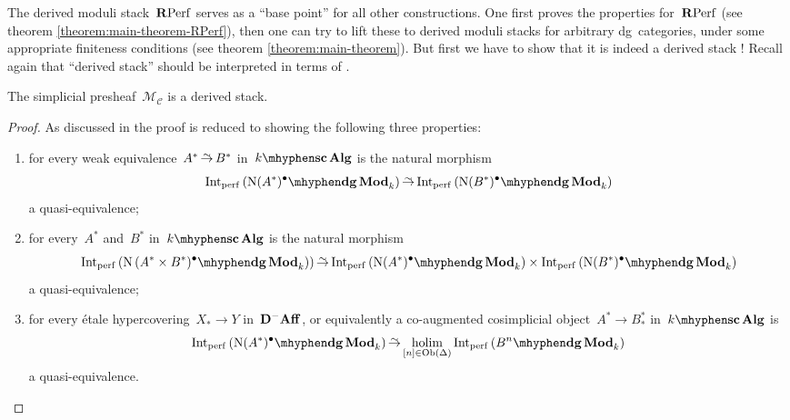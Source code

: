 \begin{refsection}
The derived moduli stack~$\mathbf{R}\mathrm{Perf}$ serves as a ``base point'' for all other constructions. One first proves the properties for~$\mathbf{R}\mathrm{Perf}$ (see theorem \ref{theorem:main-theorem-RPerf}), then one can try to lift these to derived moduli stacks for arbitrary dg~categories, under some appropriate finiteness conditions (see theorem \ref{theorem:main-theorem}). But first we have to show that it is indeed a derived stack \cite[lemma 3.1]{toen-vaquie}! Recall again that ``derived stack'' should be interpreted in terms of \cite[definition 1.3.2.1]{hagII}.

\begin{theorem}
  \label{theorem:derived-moduli-stack-is-stack}
  The simplicial presheaf~$\mathcal{M}_{\mathcal{C}}$ is a derived stack.

  \begin{proof}[Proof]
    As discussed in \cite[\S 2.1.1]{hagII} the proof is reduced to showing the following three properties:
    \begin{enumerate}
      \item for every weak equivalence~$A^*\weq B^*$ in~$\scAlg{k}$ is the natural morphism
        \begin{equation}
          \label{equation:condition-1}
          \Int_\perf\left( \dgMod{\nerve(A^*)^\bullet}_k \right)\weq\Int_\perf\left( \dgMod{\nerve(B^*)^\bullet}_k \right)
        \end{equation}
        a quasi-equivalence;
      \item for every~$A^*$ and~$B^*$ in~$\scAlg{k}$ is the natural morphism
        \begin{equation}
          \Int_\perf\left( \dgMod{\nerve\left( A^*\times B^*)^\bullet}_k \right) \right)\weq\Int_\perf\left( \dgMod{\nerve(A^*)^\bullet}_k \right)\times\Int_\perf\left( \dgMod{\nerve(B^*)^\bullet}_k \right)
        \end{equation}
        a quasi-equivalence;
      \item for every \'etale hypercovering~$X_*\to Y$ in~$\mathbf{D}^-\mathbf{Aff}$, or equivalently a co-augmented cosimplicial object~$A^*\to B_*^*$ in~$\scAlg{k}$ is
        \begin{equation}
          \label{equation:condition-3}
          \Int_\perf\left( \dgMod{\nerve(A^*)^\bullet}_k \right)\weq\holim_{[n]\in\Ob(\Delta)}\Int_\perf\left( \dgMod{B^n}_k \right)
        \end{equation}
        a quasi-equivalence.
    \end{enumerate}


\end{proof}
\end{theorem}
\end{refsection}
